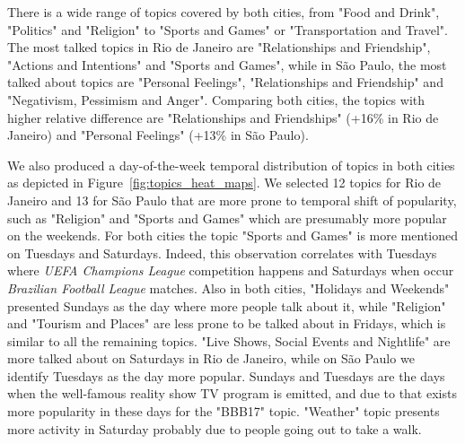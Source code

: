 There is a wide range of topics covered by both cities, from "Food and Drink", "Politics" and "Religion" to "Sports and Games" or "Transportation and Travel". The most talked topics in Rio de Janeiro are "Relationships and Friendship", "Actions and Intentions" and "Sports and Games", while in São Paulo, the most talked about topics are "Personal Feelings", "Relationships and Friendship" and "Negativism, Pessimism and Anger". Comparing both cities, the topics with higher relative difference are "Relationships and Friendships" (+16\% in Rio de Janeiro) and "Personal Feelings" (+13\% in São Paulo).

We also produced a day-of-the-week temporal distribution of topics in both cities as depicted in Figure~\ref{fig:topics_heat_maps}. We selected 12 topics for Rio de Janeiro and 13 for São Paulo that are more prone to temporal shift of popularity, such as "Religion" and "Sports and Games" which are presumably more popular on the weekends. For both cities the topic "Sports and Games" is more mentioned on Tuesdays and Saturdays. Indeed, this observation correlates with Tuesdays where \textit{UEFA Champions League} competition happens and Saturdays when occur \textit{Brazilian Football League} matches. Also in both cities, "Holidays and Weekends" presented Sundays as the day where more people talk about it, while "Religion" and "Tourism and Places" are less prone to be talked about in Fridays, which is similar to all the remaining topics. "Live Shows, Social Events and Nightlife" are more talked about on Saturdays in Rio de Janeiro, while on São Paulo we identify Tuesdays as the day more popular. Sundays and Tuesdays are the days when the well-famous reality show TV program is emitted, and due to that exists more popularity in these days for the "BBB17" topic. "Weather" topic presents more activity in Saturday probably due to people going out to take a walk.

